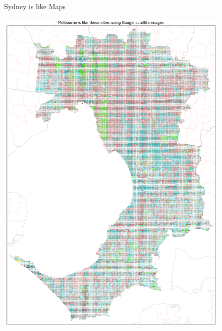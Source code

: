 \documentclass[final,3p,times,authoryear]{elsarticle}
\begin{document}
\begin{figure}[!htbp]
\caption{Sydney is like Maps}    
 \label{fig:sydmaps}  
\end{figure} 


\begin{figure}[!htbp]
\centering    
\includegraphics[scale=0.25]{Images/MelbourneOverall_sat.png} 

\end{figure}
\end{document}
